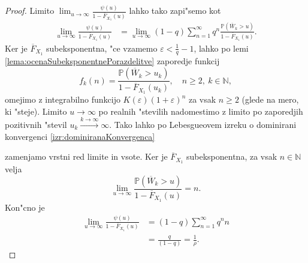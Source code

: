 \documentclass[12pt, a4paper, reqno]{amsart}
\theoremstyle{definition}
\theoremstyle{plain}
\newcommand{\N}{\mathbb{N}}
\newcommand{\Prob}{\mathbb{P}}
\newcommand{\1}{\mathds{1}}
\newcommand*{\refPriloga}[1]{%
  \begingroup
    \hypersetup{
      linkcolor=red,
      linkbordercolor=red,
    }%
    \ref{#1}%
  \endgroup
}
\begin{document}
\begin{proof}
            \noindent
            Limito $\lim_{u\to\infty}\frac{\psi(u)}{1 - \overline{F}_{X_1}(u)}$ lahko tako zapi"semo kot
            \begin{align*}
                \lim_{u\to\infty}\frac{\psi(u)}{1 - \overline{F}_{X_1}(u)}   &= \lim_{u\to\infty}(1 - q)\sum_{n=1}^{\infty}q^n\frac{\Prob\left(\overline{W}_k > u\right)}{1 - \overline{F}_{X_1}(u)}.
            \end{align*}
            Ker je $\overline{F}_{X_1}$ subeksponentna, "ce vzamemo $\varepsilon < \frac{1}{q} - 1$, 
            lahko po lemi \ref{lema:ocenaSubeksponentnePorazdelitve} zaporedje funkcij 
            \begin{equation*}
                f_k(n) = \frac{\Prob\left(\overline{W}_k > u_k\right)}{1 - \overline{F}_{X_1}(u_k)}, \quad n\geq 2,\ k\in\N, 
            \end{equation*}
            omejimo z integrabilno funkcijo $K(\varepsilon)(1 + \varepsilon)^n$ za vsak $n\geq 2$ (glede na mero, ki "steje). Limito $u\to\infty$ po 
            realnih "stevilih nadomestimo z limito po zaporedjih pozitivnih "stevil $u_k\xrightarrow{k\to\infty}\infty$.
            Tako lahko po Lebesgueovem izreku o dominirani konvergenci \refPriloga{izr:dominiranaKonvergenca}
            zamenjamo vrstni red limite in vsote.
            Ker je $\overline{F}_{X_1}$ subeksponentna, za vsak $n\in\N$ velja
            \begin{equation*}
                \lim_{u\to\infty}\frac{\Prob\left(\overline{W}_k > u\right)}{1 - \overline{F}_{X_1}(u)} = n.
            \end{equation*}
            Kon"cno je
            \begin{align*}
                \lim_{u\to\infty}\frac{\psi(u)}{1 - \overline{F}_{X_1}(u)} &= (1 - q)\sum_{n=1}^\infty q^nn \\
                                 &= \frac{q}{(1 - q)} =  \frac{1}{\rho}.
            \end{align*}
        \end{proof}
\end{document}
